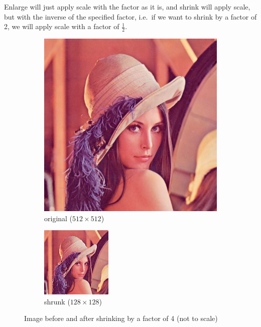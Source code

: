 \documentclass[12pt]{article}
\newcommand{\subfiguresize}{.3\textwidth}
\begin{document}
Enlarge will just apply scale with the factor as it is, and shrink will apply scale, but with the inverse of the specified factor,
i.e.\ if we want to shrink by a factor of 2, we will apply scale with a factor of $\frac{1}{2}$.


\begin{figure}[H]\centering
    \begin{subfigure}[t]{\subfiguresize}\centering
        \includegraphics[width=\textwidth]{lenac.png}
        \caption{original ($512 \times 512$)}
    \end{subfigure}
    \hspace{.05\textwidth}
    \begin{subfigure}[t]{\subfiguresize}\centering
        \includegraphics[width=.7\textwidth]{lenac_small.png}
        \caption{shrunk ($128 \times 128$)}
    \end{subfigure}
    \caption{Image before and after shrinking by a factor of 4 (not to scale)}
\end{figure}
\end{document}

